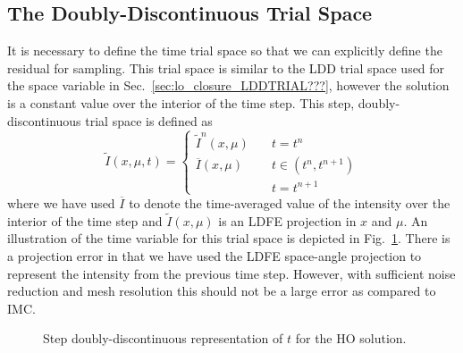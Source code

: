 \subsection{The Doubly-Discontinuous Trial Space}

It is necessary to define the time trial space so that we can explicitly define the
residual for sampling.  This trial space is similar to the LDD trial space used for the space variable
in Sec.~\ref{sec:lo_closure_LDDTRIAL???}, however the solution is a constant value over
the interior of the time step. This step, doubly-discontinuous trial space is defined as
\begin{equation}\label{eq:time_space}
    \tilde I(x,\mu,t) = \left \{ \begin{array}{cl}
        \tilde I^{n}(x,\mu)  & \quad t = t^n \\ 
        \overline I(x,\mu)  & \quad t \in (t^{n},t^{n+1}) \\               
        &  \quad        t = t^{n+1}
    \end{array}           \right.
\end{equation}
where we have used $\overline I$ to denote the time-averaged value of the intensity over
the interior of the time step and $\tilde I(x,\mu)$ is an LDFE projection in $x$ and
$\mu$.  An illustration of the time variable for this trial space
is depicted in Fig.~\ref{fig:dd_time}.    There is a projection error in that we have used the LDFE space-angle
projection to represent the intensity from the previous time step.  However, with
sufficient noise reduction and mesh resolution this should not be a large error as
compared to IMC.
\begin{figure}[H]
    \centering
    \begin{center}
    \end{center}
    \caption{Step doubly-discontinuous representation of $t$ for the HO solution.}
    \label{fig:dd_time}
\end{figure}

